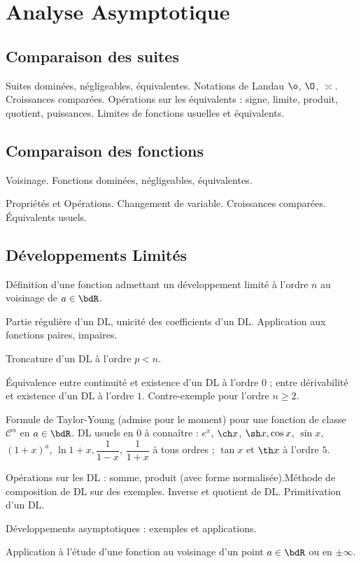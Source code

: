 \documentclass[a4paper,french,bookmarks]{article}
\begin{document}

\section*{Analyse Asymptotique}

\subsection*{Comparaison des suites}

Suites dominées, négligeables, équivalentes. Notations de Landau $\o$, $\O$, $\asymp$. Croissances comparées. Opérations sur les équivalents : signe, limite, produit, quotient, puissances. Limites de fonctions usuelles et équivalents.

\subsection*{Comparaison des fonctions}

Voisinage. Fonctions dominées, négligeables, équivalentes.

Propriétés et Opérations. Changement de variable. Croissances comparées. Équivalents usuels.

\subsection*{Développements Limités}

\begin{enumerate}
    \ithand Définition d’une fonction admettant un développement limité à l’ordre $n$ au voisinage de $a \in \bdR$.
    
    \ithand Partie régulière d’un DL, unicité des coefficients d’un DL. Application aux fonctions paires, impaires.
    
    \ithand Troncature d’un DL à l’ordre $p < n$.
    
    \ithand Équivalence entre continuité et existence d’un DL à l’ordre $0$ ; entre dérivabilité et existence d’un DL à l’ordre $1$. Contre-exemple pour l’ordre $n \geq 2$.
    
    \ithand Formule de Taylor-Young (admise pour le moment) pour une fonction de classe $\mathcal{C}^n$ en $a \in \bdR$. DL usuels en $0$ à connaître : $e^x$, $\ch x$, $ \sh x, \cos x$, $ \sin x$, $ \left(1+x\right)^a$, $ \ln{1+x}, \dfrac{1}{1-x}$, $ \dfrac{1}{1+x}$ à tous ordres ; $\tan x $ et $\th x$ à l'ordre  $5$.

    \ithand Opérations sur les DL : somme, produit (avec forme normalisée).Méthode de composition de DL sur des exemples. Inverse et quotient de DL. Primitivation d'un DL.
    
    \ithand Développements asymptotiques : exemples et applications.
    
    \ithand Application à l'étude d'une fonction au voisinage d'un point $a \in \bdR$ ou en $\pm \infty$.
\end{enumerate}
\end{document}
